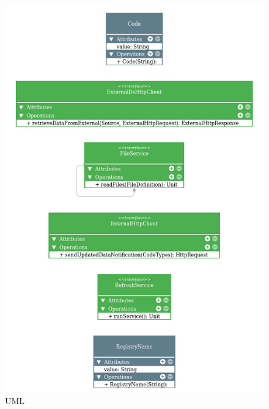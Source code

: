 \newpage
\begin{figure}[ht]
    \centering    \includegraphics{images/uml3.png}
    \caption{UML}
    \label{fig:my_label}
\end{figure}

